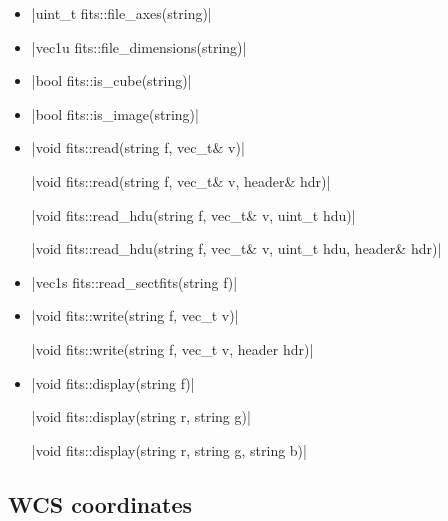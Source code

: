 \documentclass[12pt]{report}
\begin{document}
\begin{itemize}
\item \cppinline|uint_t fits::file_axes(string)| 

\item \cppinline|vec1u fits::file_dimensions(string)| 

\item \cppinline|bool fits::is_cube(string)| 

\item \cppinline|bool fits::is_image(string)| 

\item \cppinline|void fits::read(string f, vec_t& v)| 

\cppinline|void fits::read(string f, vec_t& v, header& hdr)|

\cppinline|void fits::read_hdu(string f, vec_t& v, uint_t hdu)| 

\cppinline|void fits::read_hdu(string f, vec_t& v, uint_t hdu, header& hdr)|

\item \cppinline|vec1s fits::read_sectfits(string f)| 

\item \cppinline|void fits::write(string f, vec_t v)| 

\cppinline|void fits::write(string f, vec_t v, header hdr)|

\item \cppinline|void fits::display(string f)| 

\cppinline|void fits::display(string r, string g)|

\cppinline|void fits::display(string r, string g, string b)|

\end{itemize}

\subsection{WCS coordinates}
\end{document}
